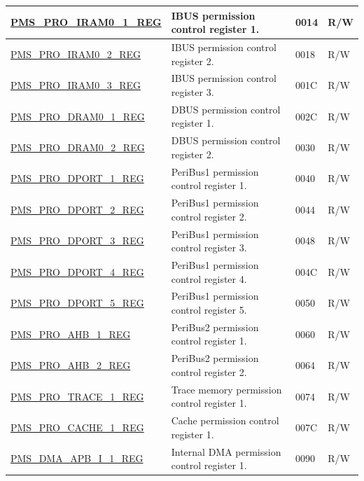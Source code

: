 \begin{longtable}{ |m{6cm} |m{7.2cm} | m{1.3cm} |m{1cm} | }
\hyperref[regdesc:PMSPROIRAM01REG]{PMS\_PRO\_IRAM0\_1\_REG} & IBUS permission control register 1. & \hexprefix{}0014 & R/W \\ \hline
\hyperref[regdesc:PMSPROIRAM02REG]{PMS\_PRO\_IRAM0\_2\_REG} & IBUS permission control register 2. & \hexprefix{}0018 & R/W \\ \hline
\hyperref[regdesc:PMSPROIRAM03REG]{PMS\_PRO\_IRAM0\_3\_REG} & IBUS permission control register 3. & \hexprefix{}001C & R/W \\ \hline
\hyperref[regdesc:PMSPRODRAM01REG]{PMS\_PRO\_DRAM0\_1\_REG} & DBUS permission control register 1. & \hexprefix{}002C & R/W \\ \hline
\hyperref[regdesc:PMSPRODRAM02REG]{PMS\_PRO\_DRAM0\_2\_REG} & DBUS permission control register 2. & \hexprefix{}0030 & R/W \\ \hline
\hyperref[regdesc:PMSPRODPORT1REG]{PMS\_PRO\_DPORT\_1\_REG} & PeriBus1 permission control register 1. & \hexprefix{}0040 & R/W \\ \hline
\hyperref[regdesc:PMSPRODPORT2REG]{PMS\_PRO\_DPORT\_2\_REG} & PeriBus1 permission control register 2. & \hexprefix{}0044 & R/W \\ \hline
\hyperref[regdesc:PMSPRODPORT3REG]{PMS\_PRO\_DPORT\_3\_REG} & PeriBus1 permission control register 3. & \hexprefix{}0048 & R/W \\ \hline
\hyperref[regdesc:PMSPRODPORT4REG]{PMS\_PRO\_DPORT\_4\_REG} & PeriBus1 permission control register 4. & \hexprefix{}004C & R/W \\ \hline
\hyperref[regdesc:PMSPRODPORT5REG]{PMS\_PRO\_DPORT\_5\_REG} & PeriBus1 permission control register 5. & \hexprefix{}0050 & R/W \\ \hline
\hyperref[regdesc:PMSPROAHB1REG]{PMS\_PRO\_AHB\_1\_REG} & PeriBus2 permission control register 1. & \hexprefix{}0060 & R/W \\ \hline
\hyperref[regdesc:PMSPROAHB2REG]{PMS\_PRO\_AHB\_2\_REG} & PeriBus2 permission control register 2. & \hexprefix{}0064 & R/W \\ \hline
\hyperref[regdesc:PMSPROTRACE1REG]{PMS\_PRO\_TRACE\_1\_REG} & Trace memory permission control register 1. & \hexprefix{}0074 & R/W \\ \hline
\hyperref[regdesc:PMSPROCACHE1REG]{PMS\_PRO\_CACHE\_1\_REG} & Cache permission control register 1. & \hexprefix{}007C & R/W \\ \hline
\hyperref[regdesc:PMSDMAAPBI1REG]{PMS\_DMA\_APB\_I\_1\_REG} & Internal DMA permission control register 1. & \hexprefix{}0090 & R/W \\ \hline

\end{longtable}
